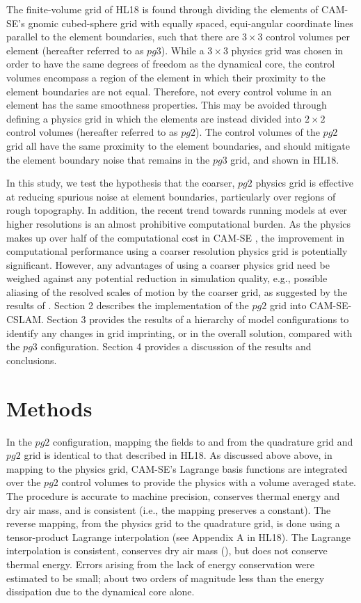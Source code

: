 \documentclass{agujournal}
\begin{document}
The finite-volume grid of HL18 is found through dividing the elements of CAM-SE's gnomic cubed-sphere grid with equally spaced, equi-angular coordinate lines parallel to the element boundaries, such that there are $3\times 3$ control volumes per element (hereafter referred to as $pg3$). While a $3\times 3$ physics grid was chosen in order to have the same degrees of freedom as the dynamical core, the control volumes encompass a region of the element in which their proximity to the element boundaries are not equal. Therefore, not every control volume in an element has the same smoothness properties. This may be avoided through defining a physics grid in which the elements are instead divided into $2\times 2$ control volumes (hereafter referred to as $pg2$). The control volumes of the $pg2$ grid all have the same proximity to the element boundaries, and should mitigate the element boundary noise that remains in the $pg3$ grid, and shown in HL18.

In this study, we test the hypothesis that the coarser, $pg2$ physics grid is effective at reducing spurious noise at element boundaries, particularly over regions of rough topography. In addition, the recent trend towards running models at ever higher resolutions is an almost prohibitive computational burden. As the physics makes up over half of the computational cost in CAM-SE \citep{LetAl2018JAMES}, the improvement in computational performance using a coarser resolution physics grid is potentially significant. However, any advantages of using a coarser physics grid need be weighed against any potential reduction in simulation quality, e.g., possible aliasing of the resolved scales of motion by the coarser grid, as suggested by the results of \cite{W1999T}. Section 2 describes the implementation of the $pg2$ grid into CAM-SE-CSLAM. Section 3 provides the results of a hierarchy of model configurations to identify any changes in grid imprinting, or in the overall solution, compared with the $pg3$ configuration. Section 4 provides a discussion of the results and conclusions.

\section{Methods}



In the $pg2$ configuration, mapping the fields to and from the quadrature grid and $pg2$ grid is identical to that described in HL18. As discussed above above, in mapping to the physics grid, CAM-SE's Lagrange basis functions are integrated over the $pg2$ control volumes to provide the physics with a volume averaged state. The procedure is accurate to machine precision, conserves thermal energy and dry air mass, and is consistent (i.e., the mapping preserves a constant). The reverse mapping, from the physics grid to the quadrature grid, is done using a tensor-product Lagrange interpolation (see Appendix A in HL18). The Lagrange interpolation is consistent, conserves dry air mass ({\color{red}{Peter, is this true?}}), but does not conserve thermal energy. Errors arising from the lack of energy conservation were estimated to be small; about two orders of magnitude less than the energy dissipation due to the dynamical core alone.
\end{document}
